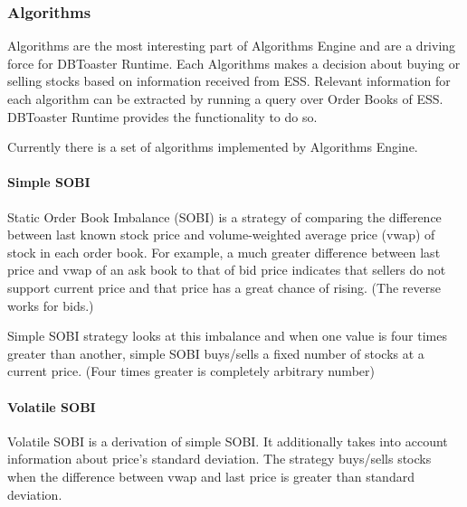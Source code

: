 \documentclass[14pt]{article}
\begin{document}


\subsubsection{Algorithms}

Algorithms are the most interesting part of Algorithms Engine and are a driving force for DBToaster Runtime. Each Algorithms makes a decision about buying or selling stocks based on information received from ESS. Relevant information for each algorithm can be extracted by running a query over Order Books of ESS. DBToaster Runtime provides the functionality to do so. 

Currently there is a set of algorithms implemented by Algorithms Engine. 

\paragraph{Simple SOBI}

Static Order Book Imbalance (SOBI) is a strategy of comparing the difference between last known stock price and volume-weighted average price (vwap) of stock in each order book. For example, a much greater difference between last price and vwap of an ask book to that of bid price indicates that sellers do not support current price and that price has a great chance of rising. (The reverse works for bids.)

Simple SOBI strategy looks at this imbalance and when one value is four times greater than another, simple SOBI buys/sells a fixed number of stocks at a current price. (Four times greater is completely arbitrary number)

\paragraph{Volatile SOBI}

Volatile SOBI is a derivation of simple SOBI. It additionally takes into account information about price's standard deviation. The strategy buys/sells stocks when the difference between vwap and last price is greater than standard deviation.
\end{document}
